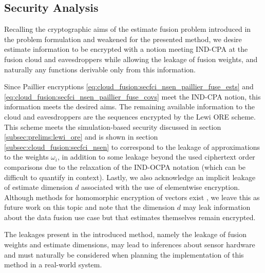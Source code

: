 % 
% 

\subsection{Security Analysis}\label{subsec:cloud_fusion:secfci_security}
Recalling the cryptographic aims of the estimate fusion problem introduced in the problem formulation and weakened for the presented method, we desire estimate information to be encrypted with a notion meeting IND-CPA at the fusion cloud and eavesdroppers while allowing the leakage of fusion weights, and naturally any functions derivable only from this information.

Since Paillier encryptions \eqref{eq:cloud_fusion:secfci_nsen_paillier_fuse_ests} and \eqref{eq:cloud_fusion:secfci_nsen_paillier_fuse_covs} meet the IND-CPA notion, this information meets the desired aims. The remaining available information to the cloud and eavesdroppers are the sequences encrypted by the Lewi ORE scheme. This scheme meets the simulation-based security discussed in section \ref{subsec:prelims:lewi_ore} and is shown in section \ref{subsec:cloud_fusion:secfci_nsen} to correspond to the leakage of approximations to the weights $\omega_i$, in addition to some leakage beyond the used ciphertext order comparisons due to the relaxation of the IND-OCPA notation (which can be difficult to quantify in context). Lastly, we also acknowledge an implicit leakage of estimate dimension $d$ associated with the use of elementwise encryption. Although methods for homomorphic encryption of vectors exist \cite{alexandruPrivateWeightedSum2022}, we leave this as future work on this topic and note that the dimension $d$ may leak information about the data fusion use case but that estimates themselves remain encrypted.

The leakages present in the introduced method, namely the leakage of fusion weights and estimate dimensions, may lead to inferences about sensor hardware and must naturally be considered when planning the implementation of this method in a real-world system.

% 
% 


